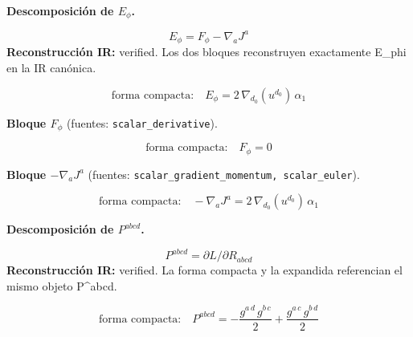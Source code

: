 \documentclass[11pt]{article}
\begin{document}
\par\medskip\noindent\textbf{Descomposición de $ E_{\phi} $.}\par
\begin{dmath*}[breakdepth={5}]
E_{\phi}=F_{\phi}-\nabla_aJ^a
\end{dmath*}
\textbf{Reconstrucción IR:} verified. Los dos bloques reconstruyen exactamente E\_phi en la IR canónica.\par
\begin{dmath*}[breakdepth={5}]
\text{forma compacta:}\quad E_{\phi} = 2\,\nabla_{d_{0}}\!\left(u{}^{d_{0}}\right)\,\alpha_{1}
\end{dmath*}
\par\smallskip\noindent\textbf{Bloque $ F_{\phi} $} (fuentes: \texttt{scalar\_derivative}).\par
\begin{dmath*}[breakdepth={5}]
\text{forma compacta:}\quad F_{\phi} = 0
\end{dmath*}
\par\smallskip\noindent\textbf{Bloque $ -\nabla_a J^a $} (fuentes: \texttt{scalar\_gradient\_momentum, scalar\_euler}).\par
\begin{dmath*}[breakdepth={5}]
\text{forma compacta:}\quad -\nabla_a J^a = 2\,\nabla_{d_{0}}\!\left(u{}^{d_{0}}\right)\,\alpha_{1}
\end{dmath*}
\par\medskip\noindent\textbf{Descomposición de $ P^{abcd} $.}\par
\begin{dmath*}[breakdepth={5}]
P^{abcd}=\partial L/\partial R_{abcd}
\end{dmath*}
\textbf{Reconstrucción IR:} verified. La forma compacta y la expandida referencian el mismo objeto P^{abcd}.\par
\begin{dmath*}[breakdepth={5}]
\text{forma compacta:}\quad P^{abcd} = -\frac{g{}^{a\,d}\,g{}^{b\,c}}{2} + \frac{g{}^{a\,c}\,g{}^{b\,d}}{2}
\end{dmath*}
\end{document}
